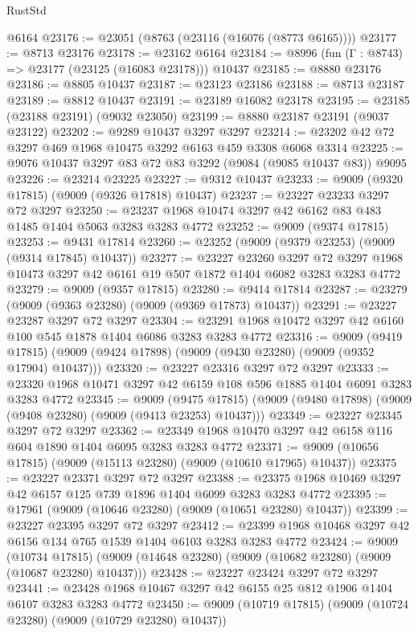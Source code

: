\begin{lexlean}{RustStd}
\begin{coremodule}
    @6164
@23176 := @23051 (@8763 (@23116 (@16076 (@8773 @6165))))
@23177 := @8713 @23176
@23178 := @23162 @6164
@23184 := @8996 (fun (Γ : @8743) => @23177 (@23125 (@16083 @23178))) @10437
@23185 := @8880 @23176
@23186 := @8805 @10437
@23187 := @23123 @23186
@23188 := @8713 @23187
@23189 := @8812 @10437
@23191 := @23189 @16082 @23178
@23195 := @23185 (@23188 @23191) (@9032 @23050)
@23199 := @8880 @23187 @23191 (@9037 @23122)
@23202 := @9289 @10437 @3297 @3297
@23214 := @23202 @42 @72 @3297 @469 @1968 @10475 @3292 @6163 @459 @3308 @6068 @3314
@23225 := @9076 @10437 @3297 @83 @72 @83 @3292 (@9084 (@9085 @10437 @83)) @9095
@23226 := @23214 @23225
@23227 := @9312 @10437
@23233 := @9009 (@9320 @17815) (@9009 (@9326 @17818) @10437)
@23237 := @23227 @23233 @3297 @72 @3297
@23250 := @23237 @1968 @10474 @3297 @42 @6162 @83 @483 @1485 @1404 @5063 @3283 @3283 @4772
@23252 := @9009 (@9374 @17815)
@23253 := @9431 @17814
@23260 := @23252 (@9009 (@9379 @23253) (@9009 (@9314 @17845) @10437))
@23277 := @23227
    @23260
    @3297
    @72
    @3297
    @1968
    @10473
    @3297
    @42
    @6161
    @19
    @507
    @1872
    @1404
    @6082
    @3283
    @3283
    @4772
@23279 := @9009 (@9357 @17815)
@23280 := @9414 @17814
@23287 := @23279 (@9009 (@9363 @23280) (@9009 (@9369 @17873) @10437))
@23291 := @23227 @23287 @3297 @72 @3297
@23304 := @23291 @1968 @10472 @3297 @42 @6160 @100 @545 @1878 @1404 @6086 @3283 @3283 @4772
@23316 := @9009
    (@9419 @17815)
    (@9009 (@9424 @17898) (@9009 (@9430 @23280) (@9009 (@9352 @17904) @10437)))
@23320 := @23227 @23316 @3297 @72 @3297
@23333 := @23320 @1968 @10471 @3297 @42 @6159 @108 @596 @1885 @1404 @6091 @3283 @3283 @4772
@23345 := @9009
    (@9475 @17815)
    (@9009 (@9480 @17898) (@9009 (@9408 @23280) (@9009 (@9413 @23253) @10437)))
@23349 := @23227 @23345 @3297 @72 @3297
@23362 := @23349 @1968 @10470 @3297 @42 @6158 @116 @604 @1890 @1404 @6095 @3283 @3283 @4772
@23371 := @9009 (@10656 @17815) (@9009 (@15113 @23280) (@9009 (@10610 @17965) @10437))
@23375 := @23227 @23371 @3297 @72 @3297
@23388 := @23375 @1968 @10469 @3297 @42 @6157 @125 @739 @1896 @1404 @6099 @3283 @3283 @4772
@23395 := @17961 (@9009 (@10646 @23280) (@9009 (@10651 @23280) @10437))
@23399 := @23227 @23395 @3297 @72 @3297
@23412 := @23399 @1968 @10468 @3297 @42 @6156 @134 @765 @1539 @1404 @6103 @3283 @3283 @4772
@23424 := @9009
    (@10734 @17815)
    (@9009 (@14648 @23280) (@9009 (@10682 @23280) (@9009 (@10687 @23280) @10437)))
@23428 := @23227 @23424 @3297 @72 @3297
@23441 := @23428 @1968 @10467 @3297 @42 @6155 @25 @812 @1906 @1404 @6107 @3283 @3283 @4772
@23450 := @9009 (@10719 @17815) (@9009 (@10724 @23280) (@9009 (@10729 @23280) @10437))

\end{coremodule}
\end{lexlean}
